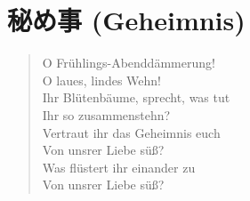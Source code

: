 
\section{秘め事 (Geheimnis)}

\begin{quote}
	O Fr\"uhlings-Abendd\"ammerung! \\
	O laues, lindes Wehn! \\
	Ihr Bl\"utenb\"aume, sprecht, was tut \\
	Ihr so zusammenstehn? \\

	Vertraut ihr das Geheimnis euch \\
	Von unsrer Liebe s\"u\ss? \\
	Was fl\"ustert ihr einander zu \\
	Von unsrer Liebe s\"u\ss?
\end{quote}
